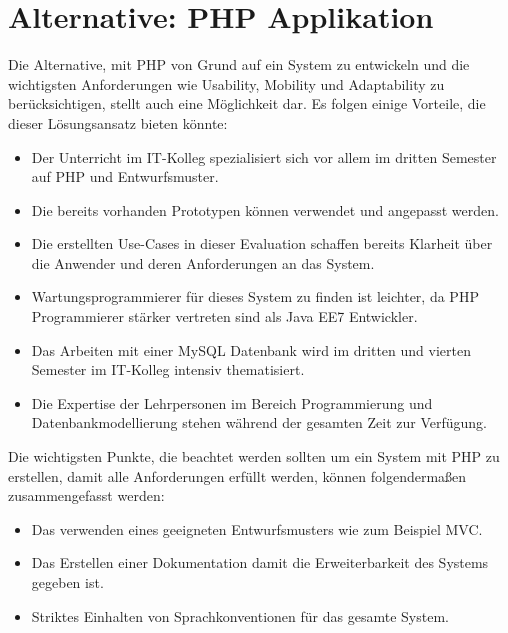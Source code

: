 
\chapter{Alternative: PHP Applikation}
\renewcommand{\currentAuthor}{Peter Pollheimer}
\label{php}
Die Alternative, mit PHP von Grund auf ein System zu entwickeln und die wichtigsten Anforderungen wie Usability, Mobility und Adaptability zu berücksichtigen, stellt auch eine Möglichkeit dar. Es folgen einige Vorteile, die dieser Lösungsansatz bieten könnte:

\begin{itemize}
	\item Der Unterricht im IT-Kolleg spezialisiert sich vor allem im dritten Semester auf PHP und Entwurfsmuster.
	\item Die bereits vorhanden Prototypen können verwendet und angepasst werden.
	\item Die erstellten Use-Cases in dieser Evaluation schaffen bereits Klarheit über die Anwender und deren Anforderungen an das System.
	\item Wartungsprogrammierer für dieses System zu finden ist leichter, da PHP Programmierer stärker vertreten sind als Java EE7 Entwickler.
	\item Das Arbeiten mit einer MySQL Datenbank wird im dritten und vierten Semester im IT-Kolleg intensiv thematisiert.
	\item Die Expertise der Lehrpersonen im Bereich Programmierung und Datenbankmodellierung stehen  während der gesamten Zeit zur Verfügung.
\end{itemize}
Die wichtigsten Punkte, die beachtet werden sollten um ein System mit PHP zu erstellen, damit alle Anforderungen erfüllt werden, können folgendermaßen zusammengefasst werden:
\begin{itemize}
	\item Das verwenden eines geeigneten Entwurfsmusters wie zum Beispiel MVC.
	\item Das Erstellen einer Dokumentation damit die Erweiterbarkeit des Systems gegeben ist. 
	\item Striktes Einhalten von Sprachkonventionen für das gesamte System.
\end{itemize}